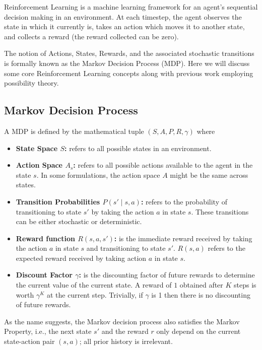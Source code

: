 \documentclass[12pt,a4paper]{report}
\begin{document}
Reinforcement Learning is a machine learning framework for an agent's sequential decision making in an environment. At each timestep, the agent observes the state in which it currently is, takes an action which moves it to another state, and collects a reward (the reward collected can be zero). \par

The notion of Actions, States, Rewards, and the associated stochastic transitions is formally known as the Markov Decision Process (MDP). Here we will discuss some core Reinforcement Learning concepts along with previous work employing possibility theory. \par

\subsection{Markov Decision Process}

A MDP is defined by the mathematical tuple $(S, A, P, R, \gamma)$ where \par

\begin{itemize}
  \item \textbf{State Space $S$:} refers to all possible states in an environment.  
  \item \textbf{Action Space $A_s$:} refers to all possible actions available to the agent in the state $s$. In some formulations, the action space $A$ might be the same across states. 
  \item \textbf{Transition Probabilities $P(s' \mid s, a)$:} refers to the probability of transitioning to state $s'$ by taking the action $a$ in state $s$. These transitions can be either stochastic or deterministic.   
  \item \textbf{Reward function $R(s, a, s')$:} is the immediate reward received by taking the action $a$ in state $s$ and transitioning to state $s'$. $R(s, a)$ refers to the expected reward received by taking action $a$ in state $s$.  
  \item \textbf{Discount Factor $\gamma$:} is the discounting factor of future rewards to determine the current value of the current state. A reward of $1$ obtained after $K$ steps is worth $\gamma^K$ at the current step. Trivially, if $\gamma$ is 1 then there is no discounting of future rewards.    
\end{itemize} \par

As the name suggests, the Markov decision process also satisfies the Markov Property, i.e., the next state $s'$ and the reward $r$ only depend on the current state-action pair $(s, a)$; all prior history is irrelevant. \par
\end{document}
